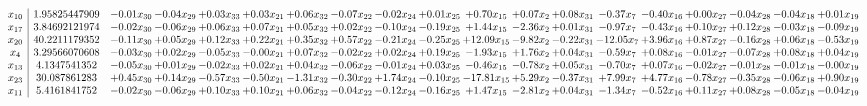 \documentclass[9pt]{article}
\begin{document}
 \[\begin{array}{c| c c@{\hskip 2pt} c@{\hskip 2pt} c@{\hskip 2pt} c@{\hskip 2pt} c@{\hskip 2pt} c@{\hskip 2pt} c@{\hskip 2pt} c@{\hskip 2pt} c@{\hskip 2pt} c@{\hskip 2pt} c@{\hskip 2pt} c@{\hskip 2pt} c@{\hskip 2pt} c@{\hskip 2pt} c@{\hskip 2pt} c@{\hskip 2pt} c@{\hskip 2pt} }
 x_{10}   &  1.95825447909 & -0.01 x_{30} & -0.04 x_{29} & +  0.03 x_{33} & +  0.03 x_{21} & +  0.06 x_{32} & -0.07 x_{22} & -0.02 x_{24} & +  0.01 x_{25} & +  0.70 x_{15} & +  0.07 x_{2} & +  0.08 x_{31} & -0.37 x_{7} & -0.40 x_{16} & +  0.00 x_{27} & -0.04 x_{28} & -0.04 x_{18} & +  0.01 x_{19}\\
 x_{17}   &  3.84692121974 & -0.02 x_{30} & -0.06 x_{29} & +  0.06 x_{33} & +  0.07 x_{21} & +  0.05 x_{32} & +  0.02 x_{22} & -0.10 x_{24} & -0.19 x_{25} & +  1.44 x_{15} & -2.36 x_{2} & +  0.01 x_{31} & -0.97 x_{7} & -0.43 x_{16} & +  0.10 x_{27} & +  0.12 x_{28} & -0.03 x_{18} & -0.09 x_{19}\\
 x_{20}   &  40.2211179352 & -0.11 x_{30} & +  0.05 x_{29} & +  0.12 x_{33} & +  0.22 x_{21} & +  0.35 x_{32} & +  0.57 x_{22} & -0.21 x_{24} & -0.25 x_{25} & + 12.09 x_{15} & -9.82 x_{2} & -0.22 x_{31} & -12.05 x_{7} & +  3.96 x_{16} & +  0.87 x_{27} & -0.16 x_{28} & +  0.06 x_{18} & -0.53 x_{19}\\
 x_{4}   &  3.29566070608 & -0.03 x_{30} & +  0.02 x_{29} & -0.05 x_{33} & -0.00 x_{21} & +  0.07 x_{32} & -0.02 x_{22} & +  0.02 x_{24} & +  0.19 x_{25} & -1.93 x_{15} & +  1.76 x_{2} & +  0.04 x_{31} & -0.59 x_{7} & +  0.08 x_{16} & -0.01 x_{27} & -0.07 x_{28} & +  0.08 x_{18} & +  0.04 x_{19}\\
 x_{13}   &  4.1347541352 & -0.05 x_{30} & +  0.01 x_{29} & -0.02 x_{33} & +  0.02 x_{21} & +  0.04 x_{32} & -0.06 x_{22} & -0.01 x_{24} & +  0.03 x_{25} & -0.46 x_{15} & -0.78 x_{2} & +  0.05 x_{31} & -0.70 x_{7} & +  0.07 x_{16} & -0.02 x_{27} & -0.01 x_{28} & -0.01 x_{18} & -0.00 x_{19}\\
 x_{23}   &  30.087861283 & +  0.45 x_{30} & +  0.14 x_{29} & -0.57 x_{33} & -0.50 x_{21} & -1.31 x_{32} & -0.30 x_{22} & +  1.74 x_{24} & -0.10 x_{25} & -17.81 x_{15} & +  5.29 x_{2} & -0.37 x_{31} & +  7.99 x_{7} & +  4.77 x_{16} & -0.78 x_{27} & -0.35 x_{28} & -0.06 x_{18} & +  0.90 x_{19}\\
 x_{11}   &  5.4161841752 & -0.02 x_{30} & -0.06 x_{29} & +  0.10 x_{33} & +  0.10 x_{21} & +  0.06 x_{32} & -0.04 x_{22} & -0.12 x_{24} & -0.16 x_{25} & +  1.47 x_{15} & -2.81 x_{2} & +  0.04 x_{31} & -1.34 x_{7} & -0.52 x_{16} & +  0.11 x_{27} & +  0.08 x_{28} & -0.05 x_{18} & -0.04 x_{19}\\

\end{array}\]
\end{document}
